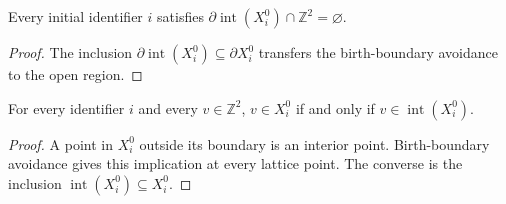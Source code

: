 \begin{lemma}
    \label{thm:area_law_initial_open_boundary_lattice}
    \leanok
    Every initial identifier $i$ satisfies
    $\partial\operatorname{int}(X_i^0)\cap\mathbb Z^2=\varnothing$.
\end{lemma}
\begin{proof}\leanok
    The inclusion
    $\partial\operatorname{int}(X_i^0)\subseteq\partial X_i^0$
    transfers the birth-boundary avoidance to the open region.
\end{proof}

\begin{lemma}
    \label{thm:area_law_initial_lattice_membership}
    \leanok
    For every identifier $i$ and every $v\in\mathbb Z^2$,
    $v\in X_i^0$ if and only if $v\in\operatorname{int}(X_i^0)$.
\end{lemma}
\begin{proof}\leanok
    A point in $X_i^0$ outside its boundary is an interior point.
    Birth-boundary avoidance gives this implication at every lattice
    point. The converse is the inclusion
    $\operatorname{int}(X_i^0)\subseteq X_i^0$.
\end{proof}
